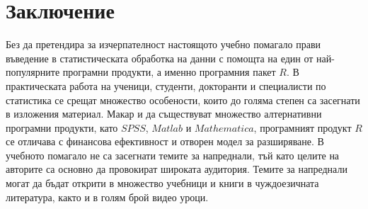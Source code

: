 ﻿\newpage
{}
\chapter*{Заключение}
\thispagestyle{empty}

Без да претендира за изчерпателност настоящото учебно помагало прави въведение в статистическата обработка на данни с помощта на един от най-популярните програмни продукти, а именно програмния пакет $R$. В практическата работа на ученици, студенти, докторанти и специалисти по статистика се срещат множество особености, които до голяма степен са засегнати в изложения материал. Макар и да съществуват множество алтернативни програмни продукти, като $SPSS$, $Matlab$ и $Mathematica$, програмният продукт $R$ се отличава с финансова ефективност и отворен модел за разширяване. В учебното помагало не са засегнати темите за напреднали, тъй като целите на авторите са основно да провокират широката аудитория. Темите за напреднали могат да бъдат открити в множество учебници и книги в чуждоезичната литература, както и в голям брой видео уроци. 

